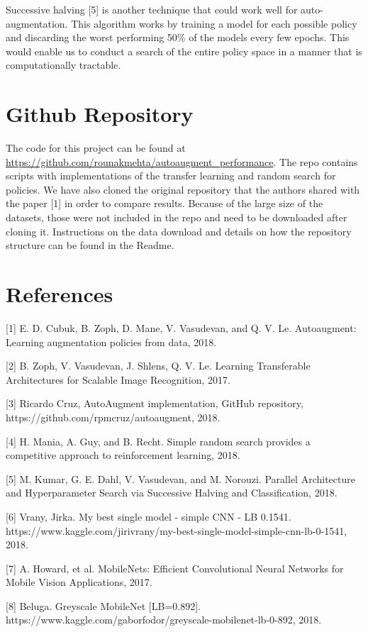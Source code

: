 \documentclass[10pt,twocolumn,letterpaper]{article}
\begin{document}
Successive halving [5] is another technique that could work well for auto-augmentation. This algorithm works by training a model for each possible policy and discarding the worst performing 50\% of the models every few epochs. This would enable us to conduct a search of the entire policy space in a manner that is computationally tractable.

\section{Github Repository}

The code for this project can be found at \url{https://github.com/rounakmehta/autoaugment_performance}. The repo contains scripts with implementations of the transfer learning and random search for policies. We have also cloned the original repository that the authors shared with the paper [1] in order to compare results. Because of the large size of the datasets, those were not included in the repo and need to be downloaded after cloning it. Instructions on the data download and details on how the repository structure can be found in the Readme.  

\section{References}

{\small



[1] E. D. Cubuk, B. Zoph, D. Mane, V. Vasudevan, and Q. V. Le. Autoaugment:   Learning  augmentation  policies  from  data, 2018. \newline

[2] B. Zoph, V. Vasudevan, J. Shlens, Q. V. Le. Learning Transferable Architectures for Scalable Image Recognition, 2017. \newline

[3] Ricardo Cruz, AutoAugment implementation, GitHub repository, https://github.com/rpmcruz/autoaugment, 2018. \newline

[4] H. Mania, A. Guy, and B. Recht. Simple random search provides a competitive approach to reinforcement learning, 2018.\newline

[5] M. Kumar, G. E. Dahl, V. Vasudevan, and M. Norouzi. Parallel Architecture and Hyperparameter Search
via Successive Halving and Classification, 2018.\newline

[6] Vrany, Jirka. My best single model - simple CNN - LB 0.1541. https://www.kaggle.com/jirivrany/my-best-single-model-simple-cnn-lb-0-1541, 2018.\newline

[7] A. Howard, et al. MobileNets: Efficient Convolutional Neural Networks for Mobile Vision
Applications, 2017. \newline

[8] Beluga. Greyscale MobileNet [LB=0.892]. https://www.kaggle.com/gaborfodor/greyscale-mobilenet-lb-0-892, 2018.\newline

}
\end{document}
